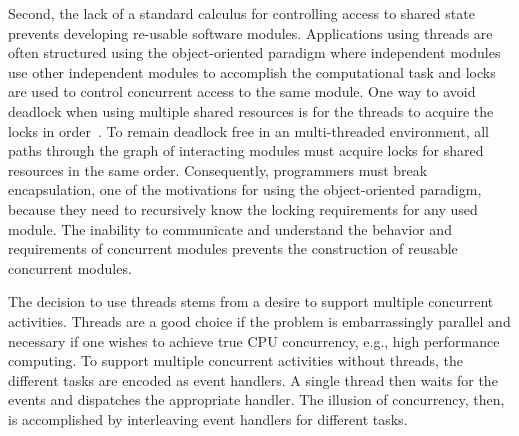 Second, the lack of a standard calculus for controlling access to shared state prevents developing re-usable software modules.
Applications using threads are often structured using the object-oriented paradigm where independent modules use other independent modules to accomplish the computational task and locks are used to control concurrent access to the same module.
One way to avoid deadlock when using multiple shared resources is for the threads to acquire the locks in order~\cite{lee_cites_this}.
To remain deadlock free in an multi-threaded environment, all paths through the graph of interacting modules must acquire locks for shared resources in the same order.
Consequently, programmers must break encapsulation, one of the motivations for using the object-oriented paradigm, because they need to recursively know the locking requirements for any used module.
The inability to communicate and understand the behavior and requirements of concurrent modules prevents the construction of reusable concurrent modules.

The decision to use threads stems from a desire to support multiple concurrent activities.
Threads are a good choice if the problem is embarrassingly parallel and necessary if one wishes to achieve true CPU concurrency, e.g., high performance computing.
To support multiple concurrent activities without threads, the different tasks are encoded as event handlers.
A single thread then waits for the events and dispatches the appropriate handler.
The illusion of concurrency, then, is accomplished by interleaving event handlers for different tasks.

